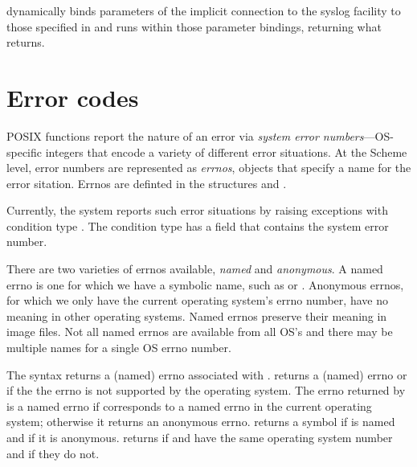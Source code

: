  dynamically binds parameters of the
implicit connection to the syslog facility to those specified in
 and runs  within those parameter bindings,
returning what  returns.

\section{Error codes}

POSIX functions report the nature of an error via \textit{system error
  numbers}---OS-specific integers that encode a variety of different
error situations.  At the Scheme level, error numbers are represented
as \textit{errnos}, objects that specify a name for the error
sitation.  Errnos are definted in the structures 
and .

Currently, the system reports such error situations by raising
exceptions with condition type .  The
 condition type has a field  that contains
the system error number.

There are two varieties of errnos available, {\em named} and {\em anonymous}.
A named errno is one for which we have a symbolic name, such as 
 or .
Anonymous errnos, for which we only have the current operating system's
 errno number, have no meaning in other operating systems.
Named errnos preserve their meaning in image files.
Not all named errnos are available from all OS's and
 there may be multiple names for a single OS errno number.

\begin{protos}
\end{protos}
\noindent
The syntax  returns a (named) errno associated with
.
 returns a (named) errno or  if the
 the errno  is not supported by the operating system.
The errno returned by  is a named errno if
  corresponds to a named errno in the current operating
 system; otherwise it returns an anonymous errno.
 returns a symbol if  is named and
  if it is anonymous.
 returns  if  and 
 have the same operating system number and  if they do not.

